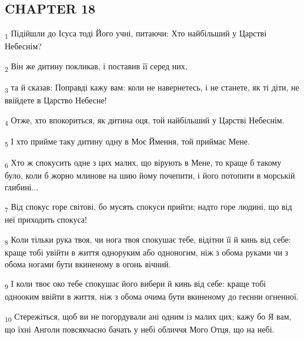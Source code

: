 \subsection{CHAPTER 18}
\begin{tcolorbox}
\textsubscript{1} Підійшли до Ісуса тоді Його учні, питаючи: Хто найбільший у Царстві Небеснім?
\end{tcolorbox}
\begin{tcolorbox}
\textsubscript{2} Він же дитину покликав, і поставив її серед них,
\end{tcolorbox}
\begin{tcolorbox}
\textsubscript{3} та й сказав: Поправді кажу вам: коли не навернетесь, і не станете, як ті діти, не ввійдете в Царство Небесне!
\end{tcolorbox}
\begin{tcolorbox}
\textsubscript{4} Отже, хто впокориться, як дитина оця, той найбільший у Царстві Небеснім.
\end{tcolorbox}
\begin{tcolorbox}
\textsubscript{5} І хто прийме таку дитину одну в Моє Ймення, той приймає Мене.
\end{tcolorbox}
\begin{tcolorbox}
\textsubscript{6} Хто ж спокусить одне з цих малих, що вірують в Мене, то краще б такому було, коли б жорно млинове на шию йому почепити, і його потопити в морській глибині...
\end{tcolorbox}
\begin{tcolorbox}
\textsubscript{7} Від спокус горе світові, бо мусять спокуси прийти; надто горе людині, що від неї приходить спокуса!
\end{tcolorbox}
\begin{tcolorbox}
\textsubscript{8} Коли тільки рука твоя, чи нога твоя спокушає тебе, відітни її й кинь від себе: краще тобі увійти в життя одноруким або одноногим, ніж з обома руками чи з обома ногами бути вкиненому в огонь вічний.
\end{tcolorbox}
\begin{tcolorbox}
\textsubscript{9} І коли твоє око тебе спокушає його вибери й кинь від себе: краще тобі однооким ввійти в життя, ніж з обома очима бути вкиненому до геєнни огненної.
\end{tcolorbox}
\begin{tcolorbox}
\textsubscript{10} Стережіться, щоб ви не погордували ані одним із малих цих; кажу бо Я вам, що їхні Анголи повсякчасно бачать у небі обличчя Мого Отця, що на небі.
\end{tcolorbox}
